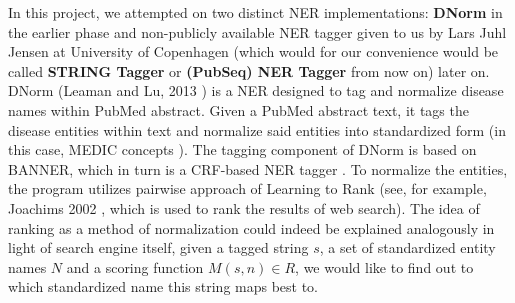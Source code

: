 In this project, we attempted on two distinct NER implementations: \textbf{DNorm} in the earlier phase and non-publicly available NER tagger given to us by Lars Juhl Jensen at University of Copenhagen (which would for our convenience would be called \textbf{STRING Tagger} or \textbf{(PubSeq) NER Tagger} from now on) later on. DNorm (Leaman and Lu, 2013 \citep{leaman2013dnorm}) is a NER designed to tag and normalize disease names within PubMed abstract. Given a PubMed abstract text, it tags the disease entities within text and normalize said entities into standardized form (in this case, MEDIC concepts \citep{davis2012medic}). The tagging component of DNorm is based on BANNER, which in turn is a CRF-based NER tagger \citep{leaman2008banner}. To normalize the entities, the program utilizes pairwise approach of Learning to Rank \citep{liu2009learning} (see, for example, Joachims 2002 \citep{joachims2002optimizing}, which is used to rank the results of web search). The idea of ranking as a method of normalization could indeed be explained analogously in light of search engine itself, given a tagged string $s$, a set of standardized entity names $N$ and a scoring function $M(s, n) \in R$, we would like to find out to which standardized name this string maps best to.

